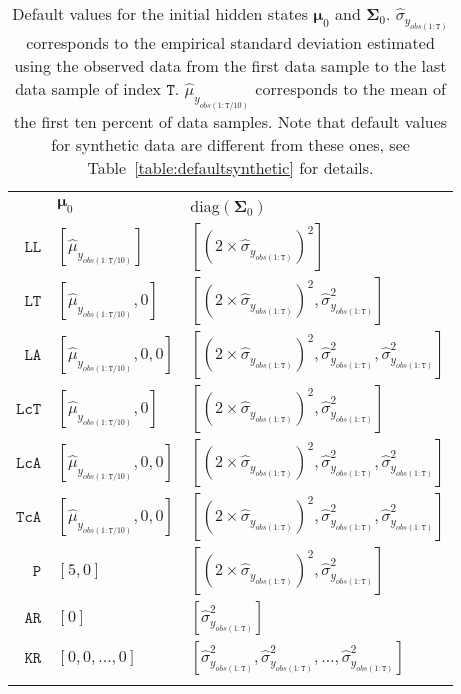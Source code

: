 \begin{table}[h]\centering
  \caption{Default values for the initial hidden states $\bm{\mu}_{0}$ and $\mathbf{\Sigma}_{0}$.   $\hat{\sigma}_{y_{obs(1:\mathtt{T})}}$ corresponds to the empirical standard deviation estimated using the observed data from the first data sample to the last data sample of index $\mathtt{T}$.   $\hat{\mu}_{y_{obs(1:\mathtt{T}/10)}}$ corresponds to the mean of the first ten percent of data samples. Note that default values for synthetic data are different from these ones, see Table~\ref{table:defaultsynthetic} for details. } 
     \begin{tabular}{r|ll}\thickhline
        & $\bm{\mu}_{0}$ & diag$(\mathbf{\Sigma}_{0})$ \\ \cmidrule(lr){1-3}
       $ \mathtt{LL}$ & $[\hat{\mu}_{y_{obs(1:\mathtt{T}/10)}}]$ & $[(2\times\hat{\sigma}_{y_{obs(1:\mathtt{T})}})^{2}]$\\
        $ \mathtt{LT}$ & $[\hat{\mu}_{y_{obs(1:\mathtt{T}/10)}}, 0]$ & $[(2\times\hat{\sigma}_{y_{obs(1:\mathtt{T})}})^{2}, \hat{\sigma}_{y_{obs(1:\mathtt{T})}}^{2}]$\\
        $ \mathtt{LA}$ & $[\hat{\mu}_{y_{obs(1:\mathtt{T}/10)}}, 0, 0]$ & $[(2\times\hat{\sigma}_{y_{obs(1:\mathtt{T})}})^{2}, \hat{\sigma}_{y_{obs(1:\mathtt{T})}}^{2},  \hat{\sigma}_{y_{obs(1:\mathtt{T})}}^{2}]$\\
        $ \mathtt{LcT}$ & $[\hat{\mu}_{y_{obs(1:\mathtt{T}/10)}}, 0]$ & $[(2\times\hat{\sigma}_{y_{obs(1:\mathtt{T})}})^{2}, \hat{\sigma}_{y_{obs(1:\mathtt{T})}}^{2}]$\\
        $ \mathtt{LcA}$ & $[\hat{\mu}_{y_{obs(1:\mathtt{T}/10)}}, 0, 0]$ & $[(2\times\hat{\sigma}_{y_{obs(1:\mathtt{T})}})^{2}, \hat{\sigma}_{y_{obs(1:\mathtt{T})}}^{2},  \hat{\sigma}_{y_{obs(1:\mathtt{T})}}^{2}]$\\
        $ \mathtt{TcA}$ & $[\hat{\mu}_{y_{obs(1:\mathtt{T}/10)}}, 0, 0]$ & $[(2\times\hat{\sigma}_{y_{obs(1:\mathtt{T})}})^{2}, \hat{\sigma}_{y_{obs(1:\mathtt{T})}}^{2},  \hat{\sigma}_{y_{obs(1:\mathtt{T})}}^{2}]$\\
        $ \mathtt{P}$ & $[5, 0]$ & $[(2\times\hat{\sigma}_{y_{obs(1:\mathtt{T})}})^{2}, \hat{\sigma}_{y_{obs(1:\mathtt{T})}}^{2}]$\\
        $ \mathtt{AR}$ & $[0]$ & $[\hat{\sigma}_{y_{obs(1:\mathtt{T})}}^{2}]$\\
        $ \mathtt{KR}$ & $[0, 0, \dots, 0]$ & $[\hat{\sigma}_{y_{obs(1:\mathtt{T})}}^{2}, \hat{\sigma}_{y_{obs(1:\mathtt{T})}}^{2}, \dots,  \hat{\sigma}_{y_{obs(1:\mathtt{T})}}^{2}]$\\\thickhline
     \end{tabular}
   \label{table:defaultreal}
\end{table}





